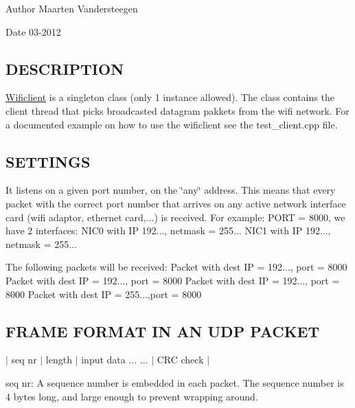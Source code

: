 \begin{DoxyAuthor}{Author}
Maarten Vandersteegen 
\end{DoxyAuthor}
\begin{DoxyDate}{Date}
03-\/2012
\end{DoxyDate}
\hypertarget{class_wifiserver_DESCRIPTION}{}\subsection{D\-E\-S\-C\-R\-I\-P\-T\-I\-O\-N}\label{class_wifiserver_DESCRIPTION}
\hyperlink{class_wificlient}{Wificlient} is a singleton class (only 1 instance allowed). The class contains the client thread that picks broadcasted datagram pakkets from the wifi network. For a documented example on how to use the wificlient see the test\-\_\-client.\-cpp file.\hypertarget{class_wifiserver_NETWORK}{}\subsection{S\-E\-T\-T\-I\-N\-G\-S}\label{class_wifiserver_NETWORK}
It listens on a given port number, on the \char`\"{}any\char`\"{} address. This means that every packet with the correct port number that arrives on any active network interface card (wifi adaptor, ethernet card,...) is received. For example\-: P\-O\-R\-T = 8000, we have 2 interfaces\-: N\-I\-C0 with I\-P 192..., netmask = 255... N\-I\-C1 with I\-P 192..., netmask = 255...

The following packets will be received\-: Packet with dest I\-P = 192..., port = 8000 Packet with dest I\-P = 192..., port = 8000 Packet with dest I\-P = 192..., port = 8000 Packet with dest I\-P = 255...,port = 8000\hypertarget{class_wifiserver_COMMUNICATION}{}\subsection{F\-R\-A\-M\-E F\-O\-R\-M\-A\-T I\-N A\-N U\-D\-P P\-A\-C\-K\-E\-T}\label{class_wifiserver_COMMUNICATION}


 $|$ seq nr $|$ length $|$ input data ... ... $|$ C\-R\-C check $|$


\begin{DoxyItemize}
\item seq nr\-: A sequence number is embedded in each packet. The sequence number is 4 bytes long, and large enough to prevent wrapping around.
\end{DoxyItemize}


